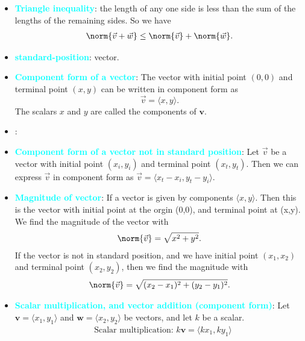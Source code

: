 \documentclass{report}
\begin{document}
\begin{itemize}
        \bigbreak \noindent 
    \item \textbf{\textcolor{cyan}{Triangle inequality}}: the length of any one side is less than the sum of the lengths of the remaining sides. So we have
        \begin{align*}
            \norm{\vec{v} + \vec{w}} \leq \norm{\vec{v}} + \norm{\vec{w}}
        .\end{align*}
    \item \textbf{\textcolor{cyan}{standard-position}}: vector.
    \item \textbf{\textcolor{cyan}{Component form of a vector}}:
        The vector with initial point $(0,0)$ and terminal point $(x,y)$ can be written in component form as
        \[
            \vec{v} = \langle x, y \rangle.
        \]
        The scalars $x$ and $y$ are called the components of $\mathbf{v}$.
    \item \textbf{\textcolor{cyan}{}}:
    \item \textbf{\textcolor{cyan}{Component form of a vector not in standard position}}: 
        Let $\vec{v}$ be a vector with initial point $(x_i, y_i)$ and terminal point $(x_t, y_t)$. Then we can express $\vec{v}$ in component form as $\vec{v} = \langle x_t - x_i, y_t - y_i \rangle.$
    \item \textbf{\textcolor{cyan}{Magnitude of vector}}: If a vector is given by components $\langle x,y \rangle $. Then this is the vector with initial point at the orgin (0,0), and terminal point at (x,y). We find the magnitude of the vector with
        \begin{align*}
            \norm{\vec{v}} = \sqrt{x^{2} + y^{2}}
        .\end{align*}
        If the vector is not in standard position, and we have initial point $(x_{1}, x_{2})$ and terminal point $(x_{2}, y_{2})$, then we find the magnitude with 
        \begin{align*}
            \norm{\vec{v}} = \sqrt{(x_{2} - x_{1})^{2} + (y_{2} - y_{1})^{2}}
        .\end{align*}
    \item \textbf{\textcolor{cyan}{Scalar multiplication, and vector addition (component form)}}:
        Let $\mathbf{v} = \langle x_1, y_1 \rangle$ and $\mathbf{w} = \langle x_2, y_2 \rangle$ be vectors, and let $k$ be a scalar.
        \begin{align*}
            &\text{Scalar multiplication: } k\mathbf{v} = \langle kx_1, ky_1 \rangle \\

\end{align*}
\end{itemize}
\end{document}
